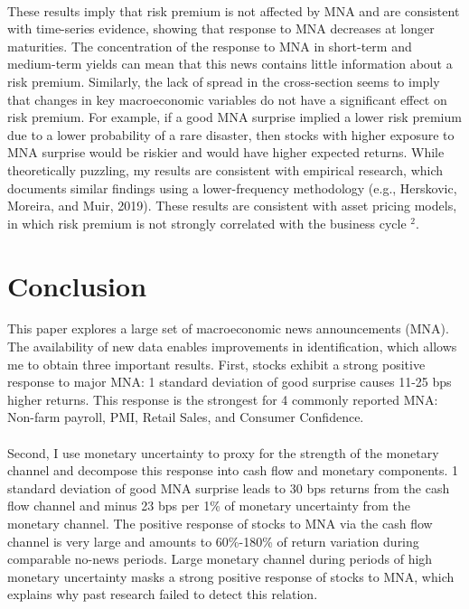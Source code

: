 \documentclass[12pt]{article}
\begin{document}
\paragraph{}
These results imply that risk premium is not affected by MNA and are consistent with time-series evidence, showing that response to MNA decreases at longer maturities. The concentration of the response to MNA in short-term and medium-term yields can mean that this news contains little information about a risk premium. Similarly, the lack of spread in the cross-section seems to imply that changes in key macroeconomic variables do not have a significant effect on risk premium.
For example, if a good MNA surprise implied a lower risk premium due to a lower probability of a rare disaster, then stocks with higher exposure to MNA surprise would be riskier and would have higher expected returns. While theoretically puzzling, my results are consistent with empirical research, which documents similar findings using a lower-frequency methodology (e.g., Herskovic, Moreira, and Muir, 2019). These results are consistent with asset pricing models, in which risk premium is not strongly correlated with the business cycle $^2$. 


\section{Conclusion} \label{sec:Model}

This paper explores a large set of macroeconomic news announcements (MNA). The availability of new data enables improvements in identification, which allows me to obtain three important results. First, stocks exhibit a strong positive response to major MNA: 1 standard deviation of good surprise causes 11-25 bps higher returns. This response is the strongest for 4 commonly reported MNA: Non-farm payroll, PMI, Retail Sales, and Consumer Confidence. 
\paragraph{}
Second, I use monetary uncertainty to proxy for the strength of the monetary channel and decompose this response into cash flow and monetary components. 1 standard deviation of good MNA surprise leads to 30 bps returns from the cash flow channel and minus 23 bps per 1\% of monetary uncertainty from the monetary channel. The positive response of stocks to MNA via the cash flow channel is very large and amounts to 60\%-180\% of return variation during comparable no-news periods. Large monetary channel during periods of high monetary uncertainty masks a strong positive response of stocks to MNA, which explains why past research failed to detect this relation.
\end{document}

